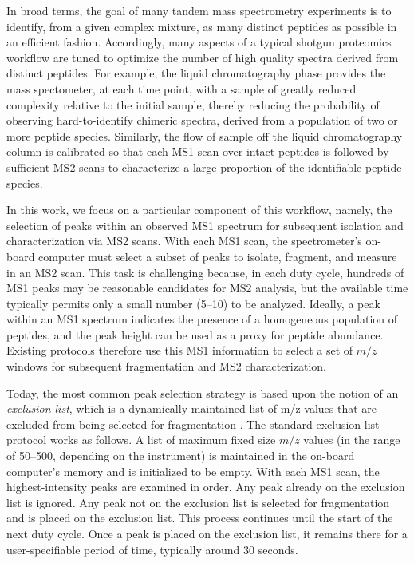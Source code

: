 \documentclass[12pt]{article}
\begin{document}
In broad terms, the goal of many tandem mass spectrometry experiments
is to identify, from a given complex mixture, as many distinct
peptides as possible in an efficient fashion.  Accordingly, many
aspects of a typical shotgun proteomics workflow are tuned to optimize
the number of high quality spectra derived from distinct peptides.
For example, the liquid chromatography phase provides the mass
spectometer, at each time point, with a sample of greatly reduced
complexity relative to the initial sample, thereby reducing the probability of observing
hard-to-identify chimeric spectra, derived from a population of two or
more peptide species.  Similarly, the flow of sample off the liquid
chromatography column is calibrated so that each MS1 scan over intact
peptides is followed by sufficient MS2 scans to characterize a large
proportion of the identifiable peptide species.

In this work, we focus on a particular component of this workflow,
namely, the selection of peaks within an observed MS1 spectrum for
subsequent isolation and characterization via MS2 scans.  With each
MS1 scan, the spectrometer's on-board computer must select a subset of
peaks to isolate, fragment, and measure in an MS2 scan. This task is
challenging because, in each duty cycle, hundreds of MS1 peaks may be
reasonable candidates for MS2 analysis, but the available time
typically permits only a small number (5--10) to be analyzed.
Ideally, a peak within an MS1 spectrum indicates the presence of a
homogeneous population of peptides, and the peak height can be used as
a proxy for peptide abundance.  Existing protocols therefore use this MS1
information to select a set of $m/z$ windows for subsequent
fragmentation and MS2 characterization.

Today, the most common peak selection strategy is based upon the
notion of an {\em exclusion list}, which is a dynamically maintained
list of m/z values that are excluded from being selected for
fragmentation \cite{kohli:alternative}.  The standard exclusion list protocol
works as follows. A list of maximum fixed size $m/z$
values (in the range of
50--500, depending on the instrument) is maintained in the on-board computer's memory and is
initialized to be empty. With each MS1 scan, the highest-intensity
peaks are examined in order. Any peak already on the exclusion list is
ignored. Any peak not on the exclusion list is selected for
fragmentation and is placed on the exclusion list. This process
continues until the start of the next duty cycle.  Once a peak is
placed on the exclusion list, it remains there for a user-specifiable
period of time, typically around 30 seconds.
\end{document}
